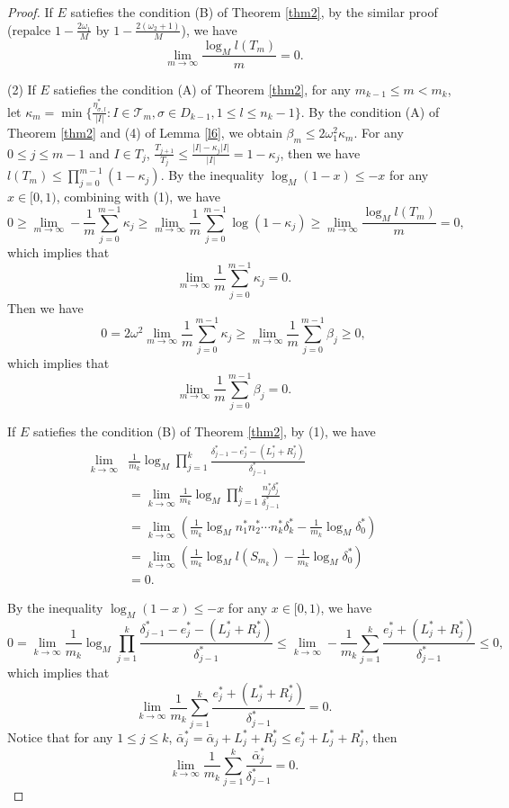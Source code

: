 \documentclass[10pt,a4paper]{amsart}
\begin{document}
\begin{proof}
If $E$ satiefies the condition {\rm(B)} of Theorem {\rm\ref{thm2}}, by the similar proof (repalce $1-\frac{2\omega_1}{M}$ by $1-\frac{2(\omega_2+1)}{M}$), we have
$$\lim_{m \to \infty} \frac{\log_M l(T_m) }{m}=0.$$

(2) If $E$ satiefies the condition {\rm(A)} of Theorem {\rm\ref{thm2}}, for any $m_{k-1}\le m <m_k$, let $\kappa_m=\min\{\frac{\eta^*_{\sigma,l}}{|I|}:I\in\mathcal{T}_m, \sigma \in D_{k-1}, 1\le l\le n_k-1\}$. By the condition (A) of Theorem \ref{thm2} and (4) of Lemma \ref{l6}, we obtain $\beta_m\le 2\omega_1^2\kappa_m$. For any $0\le j\le m-1$ and $I\in T_j$, $\frac{T_{j+1}}{T_j}\le \frac{|I|-\kappa_j|I|}{|I|}=1-\kappa_j$, then  we have $l(T_m)\le \prod_{j=0}^{m-1}(1-\kappa_j)$. By the inequality $\log_M(1-x)\le -x$ for any $x\in[0,1)$, combining with (1), we have
$$0\ge \lim_{m\to \infty}-\frac{1}{m}\sum_{j=0}^{m-1}\kappa_j\ge \lim_{m\to \infty}\frac{1}{m}\sum_{j=0}^{m-1}\log(1-\kappa_j)\ge \lim_{m\to \infty}\frac{\log_{M}l(T_{m}) }{m}=0,$$
which implies that $$\lim_{m\to \infty}\frac{1}{m}\sum_{j=0}^{m-1}\kappa_j=0.$$
Then we have
$$0=2\omega^2\lim_{m\to \infty}\frac{1}{m}\sum_{j=0}^{m-1}\kappa_j\ge \lim_{m\to \infty}\frac{1}{m}\sum_{j=0}^{m-1}\beta_j\ge 0,$$
which implies that
$$\lim_{m\to \infty}\frac{1}{m}\sum_{j=0}^{m-1}\beta_j=0.$$

If $E$ satiefies the condition {\rm(B)} of Theorem {\rm\ref{thm2}}, by (1), we have
\begin{equation*}
\begin{aligned}
\lim_{k \to \infty} &\frac{1}{m_k} \log_{M}\prod_{j = 1}^{k}\frac{\delta^*_{j-1}-e^*_{j}-(L^*_j+R^*_j)}{\delta^*_{j-1}}\\
&= \lim_{k \to \infty}\frac{1}{m_k}\log_{M}\prod_{j = 1}^{k}\frac{n^*_j\delta^*_j}{\delta^*_{j-1}}\\
&= \lim_{k \to \infty}(\frac{1}{m_k}\log_{M}n^*_1n^*_2\cdots n^*_k\delta^*_k-\frac{1}{m_k}\log_{M}\delta^*_0)\\
&= \lim_{k \to \infty}(\frac{1}{m_k}\log_{M}l(S_{m_k}) -\frac{1}{m_k}\log_{M}\delta^*_0)\\
&=0.
\end{aligned}
\end{equation*}

By the inequality $\log_M(1-x)\le -x$ for any $x\in[0,1)$, we have $$0=\lim_{k \to \infty} \frac{1}{m_k} \log_{M}\prod_{j = 1}^{k}\frac{\delta^*_{j-1}-e^*_{j}-(L^*_j+R^*_j)}{\delta^*_{j-1}}\le\lim_{k \to \infty} -\frac{1}{m_k} \sum_{j = 1}^{k}\frac{e^*_{j}+(L^*_j+R^*_j)}{\delta^*_{j-1}}\le 0,$$
which implies that
$$\lim_{k \to \infty} \frac{1}{m_k} \sum_{j = 1}^{k}\frac{e^*_{j}+(L^*_j+R^*_j)}{\delta^*_{j-1}}=0.$$
Notice that for any $1\le j \le k$, $\bar\alpha^*_{j}=\bar\alpha_{j}+L^*_j+R^*_j\le e^*_{j}+L^*_j+R^*_j$, then
\begin{equation}\label{65}
\lim_{k \to \infty} \frac{1}{m_k} \sum_{j = 1}^{k}\frac{\bar{\alpha}^*_j}{\delta^*_{j-1}}=0.
\end{equation}


\end{proof}
\end{document}
